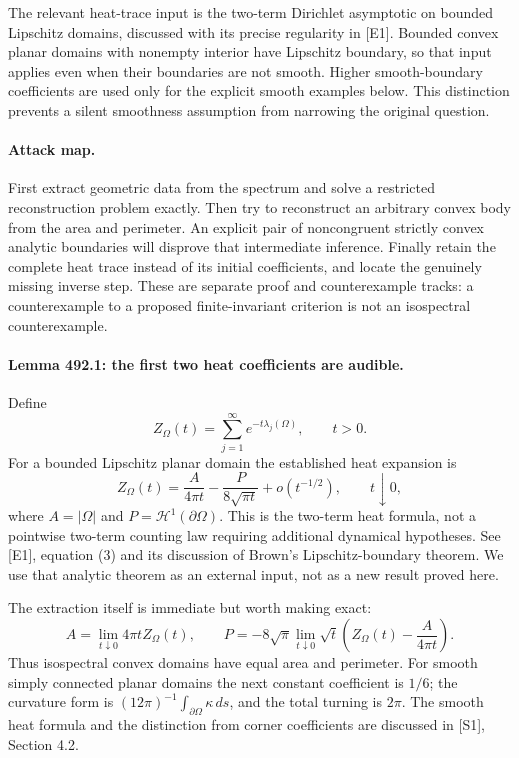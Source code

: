 \documentclass[11pt]{article}
\begin{document}
The relevant heat-trace input is the two-term Dirichlet asymptotic on
bounded Lipschitz domains, discussed with its precise regularity in [E1].
Bounded convex planar domains with nonempty interior have Lipschitz
boundary, so that input applies even when their boundaries are not smooth.
Higher smooth-boundary coefficients are used only for the explicit smooth
examples below. This distinction prevents a silent smoothness assumption
from narrowing the original question.

\paragraph{Attack map.}
First extract geometric data from the spectrum and solve a restricted
reconstruction problem exactly. Then try to reconstruct an arbitrary convex
body from the area and perimeter. An explicit pair of noncongruent strictly
convex analytic boundaries will disprove that intermediate inference.
Finally retain the complete heat trace instead of its initial coefficients,
and locate the genuinely missing inverse step. These are separate proof and
counterexample tracks: a counterexample to a proposed finite-invariant
criterion is not an isospectral counterexample.

\paragraph{Lemma 492.1: the first two heat coefficients are audible.}
Define
\[
 Z_\Omega(t)=\sum_{j=1}^{\infty}e^{-t\lambda_j(\Omega)},
                 \qquad t>0.
\]
For a bounded Lipschitz planar domain the established heat expansion is
\begin{equation}\label{a492:heat}
 Z_\Omega(t)=\frac{A}{4\pi t}
       -\frac{P}{8\sqrt{\pi t}}+o(t^{-1/2}),\qquad t\downarrow0,
\end{equation}
where $A=|\Omega|$ and $P=\mathcal H^1(\partial\Omega)$. This is the
two-term heat formula, not a pointwise two-term counting law requiring
additional dynamical hypotheses. See [E1], equation (3) and its discussion
of Brown's Lipschitz-boundary theorem. We use that analytic theorem as an
external input, not as a new result proved here.

The extraction itself is immediate but worth making exact:
\begin{equation}\label{a492:extract}
 A=\lim_{t\downarrow0}4\pi t Z_\Omega(t),\qquad
 P=-8\sqrt\pi\lim_{t\downarrow0}\sqrt t
       \left(Z_\Omega(t)-\frac{A}{4\pi t}\right).
\end{equation}
Thus isospectral convex domains have equal area and perimeter. For smooth
simply connected planar domains the next constant coefficient is $1/6$;
the curvature form is $(12\pi)^{-1}\int_{\partial\Omega}\kappa\,ds$,
and the total turning is $2\pi$. The smooth heat formula and the distinction
from corner coefficients are discussed in [S1], Section 4.2.
\end{document}
